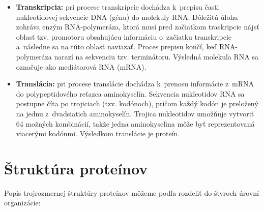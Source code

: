 \begin{itemize}

\item \textbf{Transkripcia:} pri procese transkripcie dochádza k~prepisu časti nukleotidovej sekvencie DNA (génu) do molekuly RNA. Dôležitú úlohu zohráva enzým RNA-polymeráza, ktorá musí pred začiatkom traskripcie nájsť oblasť tzv. promotoru obsahujúcu informáciu o~začiatku transkripcie a~následne sa na túto oblasť naviazať. Proces prepisu končí, keď RNA-polymeráza narazí na sekvenciu tzv. terminátoru. Výsledná molekula RNA sa označuje ako mediátorová RNA (mRNA). 
\item \textbf{Translácia:} pri procese translácie dochádza k~prenosu informácie z~mRNA do polypeptidového reťazca aminokyselín. Sekvencia nukleotidov RNA sa postupne číta po trojiciach (tzv. kodónoch), pričom každý kodón je preložený na jednu z~dvadsiatich aminokyselín. Trojica nukleotidov umožňuje vytvoriť 64 možných kombinácií, takže jedna aminokyselina môže byť reprezentovaná viacerými kodónmi. Výsledkom translácie je proteín.

\end{itemize}
\newpage
\section{Štruktúra proteínov}
Popis trojrozmernej štruktúry proteínov môžeme podľa \cite{aminokyseliny} rozdeliť do štyroch úrovní organizácie:

